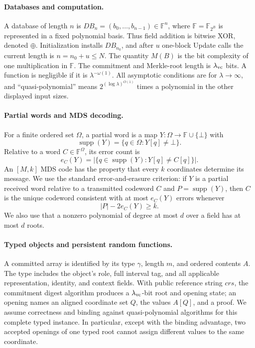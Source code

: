 \documentclass[11pt]{article}
\begin{document}
\paragraph{Databases and computation.}
A database of length $n$ is
$\mathit{DB}_n=(b_0,\ldots,b_{n-1})\in\mathbb F^n$, where
$\mathbb F=\mathbb F_{2^B}$ is represented in a fixed polynomial basis.
Thus field addition is bitwise XOR, denoted $\oplus$.  Initialization installs
$\mathit{DB}_{n_0}$, and after $u$ one-block Update calls the current length is
$n=n_0+u\le N$.  The quantity $M(B)$ is the bit complexity of one
multiplication in $\mathbb F$.  The commitment and Merkle-root length is
$\lambda_{\rm vc}$ bits.  A function is negligible if it is
$\lambda^{-\omega(1)}$.  All asymptotic conditions are for
$\lambda\to\infty$, and ``quasi-polynomial'' means
$2^{(\log\lambda)^{O(1)}}$ times a polynomial in the other displayed input
sizes.

\paragraph{Partial words and MDS decoding.}
For a finite ordered set $\Omega$, a partial word is a map
$Y:\Omega\to\mathbb F\cup\{\bot\}$ with
\[
 \operatorname{supp}(Y)=\{q\in\Omega:Y[q]\ne\bot\}.
\]
Relative to a word $C\in\mathbb F^\Omega$, its error count is
\[
 e_C(Y)=|\{q\in\operatorname{supp}(Y):Y[q]\ne C[q]\}|.
\]
An $[M,k]$ MDS code has the property that every $k$ coordinates determine its
message.  We use the standard error-and-erasure criterion: if $Y$ is a partial
received word relative to a transmitted codeword $C$ and
$P=\operatorname{supp}(Y)$, then $C$ is the unique codeword consistent with at
most $e_C(Y)$ errors whenever
\[
 |P|-2e_C(Y)\ge k.
\tag{EE}\label{eq:prelim-error-erasure}
\]
We also use that a nonzero polynomial of degree at most $d$ over a field has
at most $d$ roots.

\paragraph{Typed objects and persistent random functions.}
A committed array is identified by its type $\gamma$, length $m$, and ordered
contents $A$.  The type includes the object's role, full interval tag, and all
applicable representation, identity, and context fields.  With public
reference string $\mathit{crs}$, the commitment digest algorithm produces a
$\lambda_{\rm vc}$-bit root and opening state; an opening names an aligned
coordinate set $Q$, the values $A[Q]$, and a proof.  We assume correctness and
binding against quasi-polynomial algorithms for this complete typed instance.
In particular, except with the binding advantage, two accepted openings of
one typed root cannot assign different values to the same coordinate.
\end{document}
